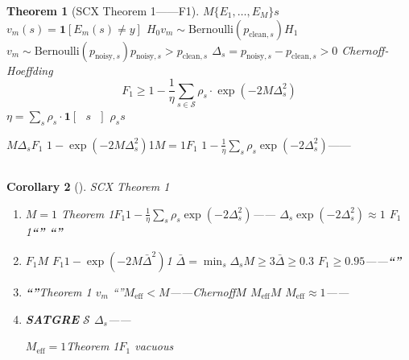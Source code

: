 \documentclass[11pt,a4paper]{article}
\newtheorem{theorem}{Theorem}[section]
\newtheorem{corollary}[theorem]{Corollary}
\theoremstyle{remark}
\newcommand{\Sstates}{\mathcal{S}}
\begin{document}
\begin{theorem}[SCX Theorem 1——F1]
\label{thm:scx1}
$M$$\{E_1, \ldots, E_M\}$$s$$v_m(s) = \mathbf{1}[E_m(s) \neq y]$
$H_0$$v_m \sim \text{Bernoulli}(p_{\text{clean},s})$$H_1$
$v_m \sim \text{Bernoulli}(p_{\text{noisy},s})$$p_{\text{noisy},s} > p_{\text{clean},s}$
$\Delta_s = p_{\text{noisy},s} - p_{\text{clean},s} > 0$
Chernoff-Hoeffding
\begin{equation}
    \boxed{
    F_1 \geq 1 - \frac{1}{\eta} \sum_{s \in \Sstates} \rho_s \cdot
    \exp\!\left(-2M \Delta_s^2\right)
    }
\end{equation}
$\eta = \sum_{s} \rho_s \cdot \mathbf{1}[\text{ } s \text{ }]$
$\rho_s$$s$
\end{theorem}

\textbf{}$M$$\Delta_s$$F_1$\textbf{}
$1 - \exp(-2M\Delta_s^2)$1$M=1$$F_1$
$1 - \frac{1}{\eta}\sum_s \rho_s \exp(-2\Delta_s^2)$——

\subsection{}

\begin{corollary}[]
\label{cor:multi_expert}
SCX Theorem 1

\begin{enumerate}[label=(\arabic*)]
    \item \textbf{}$M=1$
          Theorem 1$F_1$$1 - \frac{1}{\eta}\sum_s \rho_s \exp(-2\Delta_s^2)$——
          $\Delta_s$$\exp(-2\Delta_s^2) \approx 1$
          $F_1$1\textbf{``''
          ``''}
    \item \textbf{$F_1$}$M$
          $F_1$$1 - \exp(-2M\bar{\Delta}^2)$1
          $\bar{\Delta} = \min_s \Delta_s$$M \geq 3$$\bar{\Delta} \geq 0.3$
          $F_1 \geq 0.95$——\textbf{``''}
    \item \textbf{``''}Theorem 1
          $v_m$
          ``''$M_{\text{eff}} < M$——Chernoff$M$
          $M_{\text{eff}}$$M$
          $M_{\text{eff}} \approx 1$——
    \item \textbf{SATGRE}
          $\Sstates$
          $\Delta_s$——\textbf{}
          
          $M_{\text{eff}} = 1$Theorem 1$F_1$
          vacuous
\end{enumerate}
\end{corollary}

\textbf{}
\end{document}
